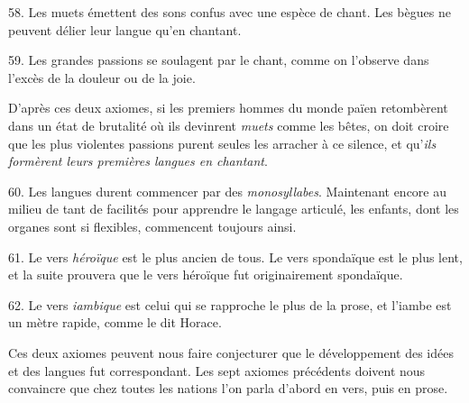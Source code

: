 \documentclass[french,twoside]{book} %
\begin{document}
58. Les muets émettent des sons confus avec une espèce de chant. Les bègues ne peuvent délier leur langue qu’en chantant.\par
59. Les grandes passions se soulagent par le chant, comme on l’observe dans l’excès de la douleur ou de la joie.\par
D’après ces deux axiomes, si les premiers hommes du monde païen retombèrent dans un état de brutalité où ils devinrent {\itshape muets} comme les bêtes, on doit croire que les plus violentes passions purent seules les arracher à ce silence, et qu’{\itshape ils formèrent leurs premières langues en chantant}.\par
\par
 60. Les langues durent commencer par des {\itshape monosyllabes}. Maintenant encore au milieu de tant de facilités pour apprendre le langage articulé, les enfants, dont les organes sont si flexibles, commencent toujours ainsi.\par
61. Le vers {\itshape héroïque} est le plus ancien de tous. Le vers spondaïque est le plus lent, et la suite prouvera que le vers héroïque fut originairement spondaïque.\par
62. Le vers {\itshape iambique} est celui qui se rapproche le plus de la prose, et l’iambe est un mètre rapide, comme le dit Horace.\par
Ces deux axiomes peuvent nous faire conjecturer que le développement des idées et des langues fut correspondant. Les sept axiomes précédents doivent nous convaincre que chez toutes les nations l’on parla d’abord en vers, puis en prose.
\end{document}
